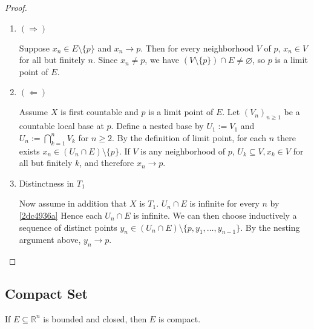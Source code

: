 \begin{proof}
    \begin{enumerate}
        \item $(\Rightarrow)$  
        
        Suppose 
        $x_n\in E\setminus\{p\}$ and $x_n\to p$. Then for every neighborhood $V$ of $p$,
        $x_n \in V$ for all but finitely $n$.
        Since $x_n\neq p$, we have $(V\setminus\{p\})\cap E\neq\varnothing$, so $p$ is a limit point of $E$.

        \item $(\Leftarrow)$ 
        
        Assume $X$ is first countable and $p$ is a limit point of $E$. 
        Let $(V_n)_{n\ge1}$ be a countable local base at $p$. 
        Define a nested base by $U_1:=V_1$ and $U_n:=\bigcap_{k=1}^n V_k$ for $n\ge2$. 
        By the definition of limit point, for each $n$ there exists $x_n\in (U_n\cap E)\setminus\{p\}$. 
        If $V$ is any neighborhood of $p$, $U_k \subseteq V, x_k \in V$ for all but finitely $k$, and therefore $x_n\to p$.

        \item Distinctness in $T_1$ 

        Now assume in addition that $X$ is $T_1$. 
        $U_n\cap E$ is infinite for every $n$ by \cref{2dc4936a}
        Hence each $U_n\cap E$ is infinite. 
        We can then choose inductively a sequence of distinct points $y_n\in (U_n\cap E)\setminus\{p,y_1,\dots,y_{n-1}\}$. 
        By the nesting argument above, $y_n\to p$.
    \end{enumerate}
\end{proof}

\subsection{Compact Set}

\begin{thm}
      If $E \subseteq \mathbb{R}^n$ is bounded and closed, then $E$ is compact.
\end{thm}

